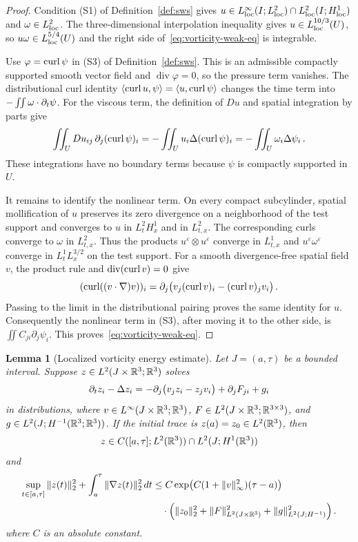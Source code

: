 \documentclass[11pt,letterpaper]{article}
\numberwithin{equation}{section}
\theoremstyle{plain}
\newtheorem{lemma}[theorem]{Lemma}
\theoremstyle{definition}
\theoremstyle{remark}
\begin{document}
\begin{proof}
Condition (S1) of Definition~\ref{def:sws} gives $u\in L^\infty_{\rm loc}(I;L^2_{\rm loc})\cap L^2_{\rm loc}(I;H^1_{\rm loc})$ and $\omega\in L^2_{\rm loc}$. The three-dimensional interpolation inequality gives $u\in L^{10/3}_{\rm loc}(U)$, so $u\omega\in L^{5/4}_{\rm loc}(U)$ and the right side of~\eqref{eq:vorticity-weak-eq} is integrable.

Use $\varphi=\operatorname{curl}\psi$ in (S3) of Definition~\ref{def:sws}. This is an admissible compactly supported smooth vector field and $\operatorname{div}\varphi=0$, so the pressure term vanishes. The distributional curl identity $\langle\operatorname{curl} u,\psi\rangle=\langle u,\operatorname{curl}\psi\rangle$ changes the time term into $-\iint\omega\cdot\partial_t\psi$. For the viscous term, the definition of $Du$ and spatial integration by parts give
\[
 \iint_U Du_{ij}\,\partial_j(\operatorname{curl}\psi)_i
 =-\iint_U u_i\Delta(\operatorname{curl}\psi)_i
 =-\iint_U\omega_i\Delta\psi_i\,.
\]
These integrations have no boundary terms because $\psi$ is compactly supported in $U$.

It remains to identify the nonlinear term. On every compact subcylinder, spatial mollification of $u$ preserves its zero divergence on a neighborhood of the test support and converges to $u$ in $L^2_tH^1_x$ and in $L^2_{t,x}$. The corresponding curls converge to $\omega$ in $L^2_{t,x}$. Thus the products $u^\varepsilon\otimes u^\varepsilon$ converge in $L^1_{t,x}$ and $u^\varepsilon\omega^\varepsilon$ converge in $L^1_tL^{3/2}_x$ on the test support. For a smooth divergence-free spatial field $v$, the product rule and $\operatorname{div}(\operatorname{curl} v)=0$ give
\[
 (\operatorname{curl}((v\cdot\nabla)v))_i
 =\partial_j\big(v_j(\operatorname{curl} v)_i-(\operatorname{curl} v)_jv_i\big)\,.
\]
Passing to the limit in the distributional pairing proves the same identity for $u$. Consequently the nonlinear term in (S3), after moving it to the other side, is $\iint C_{ji}\partial_j\psi_i$. This proves~\eqref{eq:vorticity-weak-eq}.
\end{proof}

\begin{lemma}[Localized vorticity energy estimate]\label{lem:localized-vorticity-energy}
Let $J=(a,\tau)$ be a bounded interval. Suppose $z\in L^2(J\times\mathbb{R}^3;\mathbb{R}^3)$ solves
\[
 \partial_t z_i-\Delta z_i
 =-\partial_j\big(v_jz_i-z_jv_i\big)+\partial_jF_{ji}+g_i
\]
in distributions, where $v\in L^\infty(J\times\mathbb{R}^3;\mathbb{R}^3)$, $F\in L^2(J\times\mathbb{R}^3;\mathbb{R}^{3\times3})$, and $g\in L^2(J;H^{-1}(\mathbb{R}^3;\mathbb{R}^3))$. If the initial trace is $z(a)=z_0\in L^2(\mathbb{R}^3)$, then
\[
 z\in C([a,\tau];L^2(\mathbb{R}^3))\cap L^2(J;H^1(\mathbb{R}^3))
\]
and
\begin{equation}\label{eq:localized-vorticity-energy}
\begin{split}
 \sup_{t\in[a,\tau]}\|z(t)\|_2^2+\int_a^\tau\|\nabla z(t)\|_2^2\,dt
 &\le C\exp\!\left(C(1+\|v\|_\infty^2)(\tau-a)\right)\\
 &\quad\cdot\left(\|z_0\|_2^2+\|F\|_{L^2(J\times\mathbb{R}^3)}^2
       +\|g\|_{L^2(J;H^{-1})}^2\right).
\end{split}
\end{equation}
where $C$ is an absolute constant.
\end{lemma}
\end{document}
